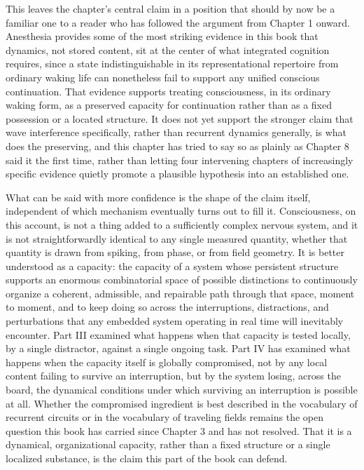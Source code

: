 \documentclass[11pt]{book}
\begin{document}
This leaves the chapter's central claim in a position that should by now be a familiar one to a reader who has followed the argument from Chapter 1 onward. Anesthesia provides some of the most striking evidence in this book that dynamics, not stored content, sit at the center of what integrated cognition requires, since a state indistinguishable in its representational repertoire from ordinary waking life can nonetheless fail to support any unified conscious continuation. That evidence supports treating consciousness, in its ordinary waking form, as a preserved capacity for continuation rather than as a fixed possession or a located structure. It does not yet support the stronger claim that wave interference specifically, rather than recurrent dynamics generally, is what does the preserving, and this chapter has tried to say so as plainly as Chapter 8 said it the first time, rather than letting four intervening chapters of increasingly specific evidence quietly promote a plausible hypothesis into an established one.

What can be said with more confidence is the shape of the claim itself, independent of which mechanism eventually turns out to fill it. Consciousness, on this account, is not a thing added to a sufficiently complex nervous system, and it is not straightforwardly identical to any single measured quantity, whether that quantity is drawn from spiking, from phase, or from field geometry. It is better understood as a capacity: the capacity of a system whose persistent structure supports an enormous combinatorial space of possible distinctions to continuously organize a coherent, admissible, and repairable path through that space, moment to moment, and to keep doing so across the interruptions, distractions, and perturbations that any embedded system operating in real time will inevitably encounter. Part III examined what happens when that capacity is tested locally, by a single distractor, against a single ongoing task. Part IV has examined what happens when the capacity itself is globally compromised, not by any local content failing to survive an interruption, but by the system losing, across the board, the dynamical conditions under which surviving an interruption is possible at all. Whether the compromised ingredient is best described in the vocabulary of recurrent circuits or in the vocabulary of traveling fields remains the open question this book has carried since Chapter 3 and has not resolved. That it is a dynamical, organizational capacity, rather than a fixed structure or a single localized substance, is the claim this part of the book can defend.
\end{document}
